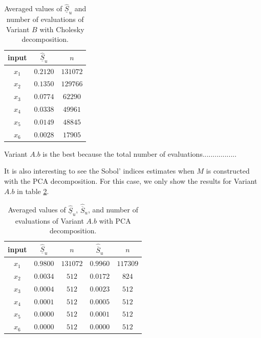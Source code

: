 \begin{table}[!ht]
\caption{Averaged values of $\widehat{\underline{S}}_u$ and number of evaluations of Variant $B$ with Cholesky decomposition.}
\centering
\begin{tabular}{ccc}
\hline
 input & $\widehat{\underline{S}}_u$ & $n$ \\ \hline
 $x_1$ & $0.2120$ & $131072$ \\ \hline
 $x_2$ & $0.1350$ & $129766$ \\ \hline
 $x_3$ & $0.0774$ & $62290$ \\ \hline
 $x_4$ & $0.0338$ & $49961$ \\ \hline
 $x_5$ & $0.0149$ & $48845$ \\ \hline
 $x_6$ & $0.0028$ & $17905$ \\ \hline \hline
\end{tabular}
\label{res.AsianChol.B}
\end{table}

Variant $A.b$ is the best because the total number of evaluations.................

It is also interesting to see the Sobol' indices estimates when $M$ is constructed with the PCA decomposition. For this case, we only show the results for Variant $A.b$ in table \ref{res.AsianPCA.Ab}.

\begin{table}[!ht]
\caption{Averaged values of $\widehat{\underline{S}}_u$, ${\widehat{\overline{S}}_u}$, and number of evaluations of Variant $A.b$ with PCA decomposition.}
\centering
\begin{tabular}{ccccc}
\hline
 input & $\widehat{\underline{S}}_u$ & $n$ & $\widehat{\overline{S}}_u$ & $n$ \\ \hline
 $x_1$ & $0.9800$ & $131072$ & $0.9960$ & $117309$ \\ \hline
 $x_2$ & $0.0034$ & $512$ & $0.0172$ & $824$ \\ \hline
 $x_3$ & $0.0004$ & $512$ & $0.0023$ & $512$ \\ \hline
 $x_4$ & $0.0001$ & $512$ & $0.0005$ & $512$ \\ \hline
 $x_5$ & $0.0000$ & $512$ & $0.0001$ & $512$ \\ \hline
 $x_6$ & $0.0000$ & $512$ & $0.0000$ & $512$ \\ \hline \hline
\end{tabular}
\label{res.AsianPCA.Ab}
\end{table}

